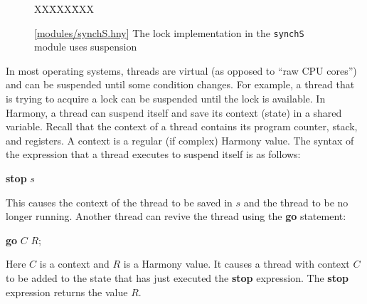 \documentclass{report}
\newcommand{\harmonysource}[1]{
\begin{tabbing}
XX\=XXX\=XXX\kill
    
\end{tabbing}
}
\newcommand{\harmonylink}[1]{%
[\href{https://harmony.cs.cornell.edu/#1}{\underline{#1}}]%
}
\newenvironment{code}{
\tcolorbox
}{
\endtcolorbox
}
\begin{document}
\begin{figure}
\begin{code}
\harmonysource{locksusp}
\end{code}
\caption{\harmonylink{modules/synchS.hny} The lock implementation in the \texttt{synchS} module uses suspension}
\label{fig:suspension}
\end{figure}

In most operating systems, threads are virtual (as opposed to ``raw CPU cores'')
and can be suspended until some condition changes.
For example, a thread that is trying to acquire a lock can be suspended until the lock is
available.
In Harmony, a thread can suspend itself and save its context (state) in a
shared variable.  Recall that the context of a thread contains
its program counter, stack, and registers.
A context is a regular (if complex) Harmony value.
The syntax of the expression that a thread executes to suspend itself
is as follows:

\begin{code}
\textbf{stop} $s$
\end{code}

This causes the context of the thread to be saved in $s$ and
the thread to be no longer running.
Another thread can revive the thread using the \textbf{go}
%
statement:

\begin{code}
\textbf{go} $C$ $R$;
\end{code}

Here $C$ is a context and $R$ is a Harmony value.
It causes a thread with context $C$ to be added to the state that has
just executed the \textbf{stop}
%
expression.  The \textbf{stop} expression returns the value $R$.
\end{document}
